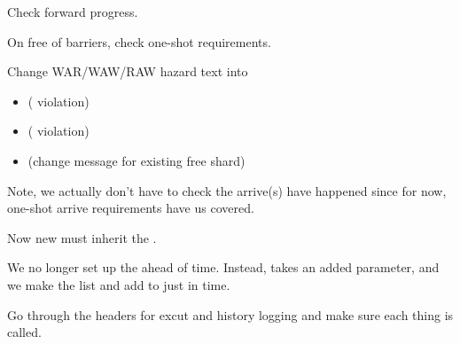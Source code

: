 Check forward progress.


On free of barriers, check one-shot requirements.

Change WAR/WAW/RAW hazard text into
\begin{itemize}
  \item {} ( violation)
  \item {} ( violation)
  \item {} (change message for existing free shard)
\end{itemize}

Note, we actually don't have to check the arrive(s) have happened since for now, one-shot arrive requirements have us covered.



Now new  must inherit the .

We no longer set up the  ahead of time.
Instead,  takes an added  parameter, and we make the  list and add to  just in time.


Go through the headers for excut and history logging and make sure each thing is called.



